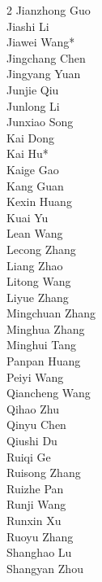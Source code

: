 \documentclass[11pt, a4paper, logo, copyright, nonumbering]{deepseek}
\begin{document}
\begin{multicols}{2}
\color{damaiblue} Jianzhong Guo \\
\color{damaiblue} Jiashi Li \\
\color{damaiblue} Jiawei Wang* \\
\color{damaiblue} Jingchang Chen \\
\color{damaiblue} Jingyang Yuan \\
\color{damaiblue} Junjie Qiu \\
\color{damaiblue} Junlong Li \\
\color{damaiblue} Junxiao Song \\
\color{damaiblue} Kai Dong \\
\color{damaiblue} Kai Hu* \\
\color{damaiblue} Kaige Gao \\
\color{damaiblue} Kang Guan \\
\color{damaiblue} Kexin Huang \\
\color{damaiblue} Kuai Yu \\
\color{damaiblue} Lean Wang \\
\color{damaiblue} Lecong Zhang \\
\color{damaiblue} Liang Zhao \\
\color{damaiblue} Litong Wang \\
\color{damaiblue} Liyue Zhang \\
\color{damaiblue} Mingchuan Zhang \\
\color{damaiblue} Minghua Zhang \\
\color{damaiblue} Minghui Tang \\
\color{damaiblue} Panpan Huang \\
\color{damaiblue} Peiyi Wang \\
\color{damaiblue} Qiancheng Wang \\
\color{damaiblue} Qihao Zhu \\
\color{damaiblue} Qinyu Chen \\
\color{damaiblue} Qiushi Du \\
\color{damaiblue} Ruiqi Ge \\
\color{damaiblue} Ruisong Zhang \\
\color{damaiblue} Ruizhe Pan \\
\color{damaiblue} Runji Wang \\
\color{damaiblue} Runxin Xu \\
\color{damaiblue} Ruoyu Zhang \\
\color{damaiblue} Shanghao Lu \\
\color{damaiblue} Shangyan Zhou \\

\end{multicols}
\end{document}
